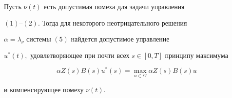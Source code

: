 \begin{thm}


Пусть $\nu(t)$ есть допустимая помеха для задачи управления


$(1)$--$(2)$. Тогда для некоторого неотрицательного решения


$\alpha = \lambda_\nu$ системы $(5)$ найдется допустимое управление


$u^*(t),$ удовлетворяющее при почти всех $s\in[0,T]$ принципу максимума


\begin{equation}


\alpha Z(s)B(s)u^*(s) = \max_{u\in\Omega}\alpha Z(s)B(s)u 


\end{equation}


и компенсирующее помеху $\nu(t)$.


\end{thm}





